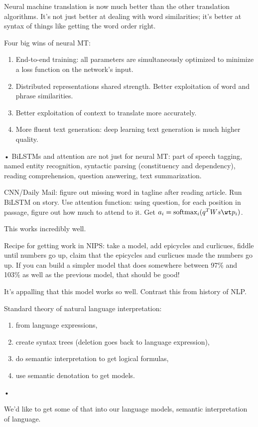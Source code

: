 Neural machine translation is now much better than the other translation algorithms. 
It's not just better at dealing with word similarities; it's better at syntax of things like getting the word order right.

Four big wins of neural MT:
\begin{enumerate}
\item
End-to-end training: all parameters are simultaneously optimized to minimize a loss function on the network's input.
\item
Distributed representations shared strength. Better exploitation of word and phrase similarities.
\item
Better exploitation of context to translate more accurately.
\item
More fluent text generation: deep learning text generation is much higher quality.
\end{enumerate}•
BiLSTMs and attention are not just for neural MT: part of speech tagging, named entity recognition, syntactic parsing (constituency and dependency), reading comprehension, question answering, text summarization.

CNN/Daily Mail: figure out missing word in tagline after reading article. Run BiLSTM on story. Use attention function: using question, for each position in passage, figure out how much to attend to it. Get $a_i = \text{softmax}_i (q^TWs\wt p_i)$. 

This works incredibly well. 

Recipe for getting work in NIPS: take a model, add epicycles and curlicues, fiddle until numbers go up, claim that the epicycles and curlicues made the numbers go up.
If you can build a simpler model that does somewhere between 97\% and 103\% as well as the previous model, that should be good!

It's appalling that this model works so well. Contrast this from history of NLP.

Standard theory of natural language interpretation: 
\begin{enumerate}
\item
from language expressions, 
\item 
create syntax trees (deletion goes back to language expression), 
\item
do semantic interpretation to get logical formulas, 
\item
use semantic denotation to get models. 
\end{enumerate}•

We'd like to get some of that into our language models, semantic interpretation of language. 

